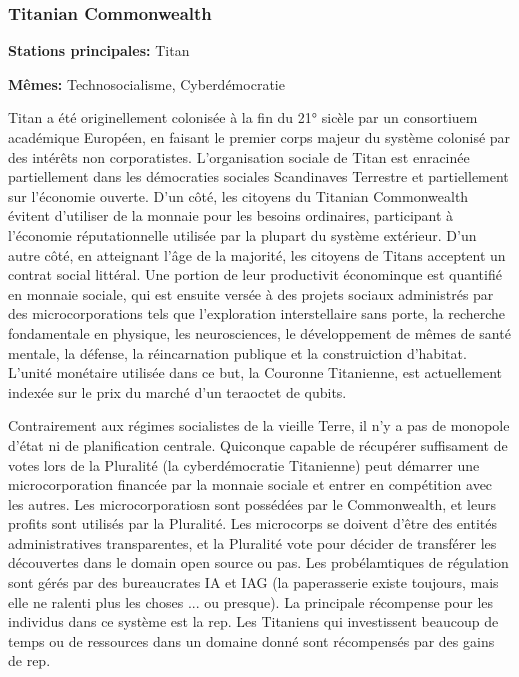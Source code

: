                                     \subsubsection{Titanian Commonwealth} \label{sec:titan-comm} 

                                    \textbf{Stations principales:} Titan 

                                    \textbf{Mêmes:} Technosocialisme, Cyberdémocratie 

                                    Titan a été originellement colonisée à la fin du 21° sicèle par un consortiuem académique Européen, en faisant le premier corps majeur du système colonisé par des intérêts non corporatistes. L'organisation sociale de Titan est enracinée partiellement dans les démocraties sociales Scandinaves Terrestre et partiellement sur l'économie ouverte. D'un côté, les citoyens du Titanian Commonwealth évitent d'utiliser de la monnaie pour les besoins ordinaires, participant à l'économie réputationnelle utilisée par la plupart du système extérieur. D'un autre côté, en atteignant l'âge de la majorité, les citoyens de Titans acceptent un contrat social littéral. Une portion de leur productivit économinque est quantifié en monnaie sociale, qui est ensuite versée à des projets sociaux administrés par des microcorporations tels que l'exploration interstellaire sans porte, la recherche fondamentale en physique, les neurosciences, le développement de mêmes de santé mentale, la défense, la réincarnation publique et la construiction d'habitat. L'unité monétaire utilisée dans ce but, la Couronne Titanienne, est actuellement indexée sur le prix du marché d'un teraoctet de qubits. 

                                    Contrairement aux régimes socialistes de la vieille Terre, il n'y a pas de monopole d'état ni de planification centrale. Quiconque capable de récupérer suffisament de votes lors de la Pluralité (la cyberdémocratie Titanienne) peut démarrer une microcorporation financée par la monnaie sociale et entrer en compétition avec les autres. Les microcorporatiosn sont possédées par le Commonwealth, et leurs profits sont utilisés par la Pluralité. Les microcorps se doivent d'être des entités administratives transparentes, et la Pluralité vote pour décider de transférer les découvertes dans le domain open source ou pas. Les probélamtiques de régulation sont gérés par des bureaucrates IA et IAG (la paperasserie existe toujours, mais elle ne ralenti plus les choses ... ou presque). La principale récompense pour les individus dans ce système est la rep. Les Titaniens qui investissent beaucoup de temps ou de ressources dans un domaine donné sont récompensés par des gains de rep. 


